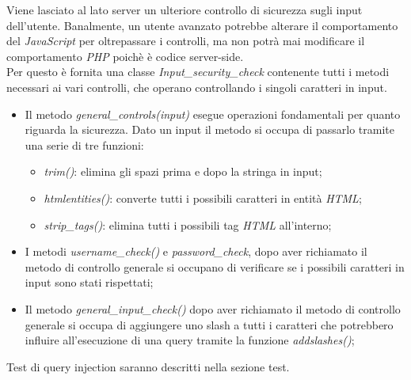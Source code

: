 Viene lasciato al lato server un ulteriore controllo di sicurezza sugli input dell'utente. Banalmente, un utente avanzato potrebbe alterare il comportamento
del \emph{JavaScript} per oltrepassare i controlli, ma non potrà mai modificare il comportamento \emph{PHP} poichè è codice server-side.\\
Per questo è fornita una classe \emph{Input\_security\_check} contenente tutti i metodi necessari ai vari controlli, che operano controllando i singoli caratteri in input.
\begin{itemize}
    \item Il metodo \emph{general\_controls(input)} esegue operazioni fondamentali per quanto riguarda la sicurezza. Dato un input il metodo si occupa di passarlo tramite una serie di tre funzioni: 
    \begin{itemize}
        \item \emph{trim()}: elimina gli spazi prima e dopo la stringa in input;
        \item \emph{htmlentities()}: converte tutti i possibili caratteri in entità \emph{HTML};
        \item \emph{strip\_tags()}: elimina tutti i possibili tag \emph{HTML} all'interno;
    \end{itemize}
    \item I metodi \emph{username\_check()} e \emph{password\_check}, dopo aver richiamato il metodo di controllo generale si occupano di verificare se i possibili caratteri in input sono stati rispettati;
    \item Il metodo \emph{general\_input\_check()} dopo aver richiamato il metodo di controllo generale si occupa di aggiungere uno slash a tutti i caratteri che potrebbero influire all'esecuzione di una query tramite la funzione \emph{addslashes()};
\end{itemize}

Test di query injection saranno descritti nella sezione test.